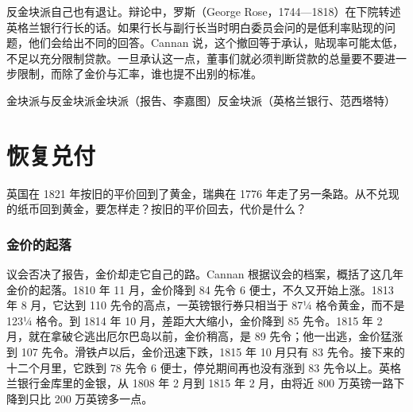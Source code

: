 反金块派自己也有退让。辩论中，罗斯（George Rose，1744—1818）在下院转述英格兰银行行长的话。如果行长与副行长当时明白委员会问的是低利率贴现的问题，他们会给出不同的回答\cite{cannan1919}。Cannan 说，这个撤回等于承认，贴现率可能太低，不足以充分限制贷款\cite{cannan1919}。一旦承认这一点，董事们就必须判断贷款的总量要不要进一步限制，而除了金价与汇率，谁也提不出别的标准。

\begin{compare}{金块派与反金块派}{金块派（报告、李嘉图）}{反金块派（英格兰银行、范西塔特）}
\end{compare}

\section{恢复兑付}\label{sec:bullion-resumption}

英国在 1821 年按旧的平价回到了黄金，瑞典在 1776 年走了另一条路。从不兑现的纸币回到黄金，要怎样走？按旧的平价回去，代价是什么？

\subsubsection{金价的起落}
议会否决了报告，金价却走它自己的路。Cannan 根据议会的档案，概括了这几年金价的起落。1810 年 11 月，金价降到 84 先令 6 便士，不久又开始上涨。1813 年 8 月，它达到 110 先令的高点，一英镑银行券只相当于 87¼ 格令黄金，而不是 123¼ 格令。到 1814 年 10 月，差距大大缩小，金价降到 85 先令。1815 年 2 月，就在拿破仑逃出厄尔巴岛以前，金价稍高，是 89 先令；他一出逃，金价猛涨到 107 先令。滑铁卢以后，金价迅速下跌，1815 年 10 月只有 83 先令。接下来的十二个月里，它跌到 78 先令 6 便士，停兑期间再也没有涨到 83 先令以上\cite{cannan1919}。英格兰银行金库里的金银，从 1808 年 2 月到 1815 年 2 月，由将近 800 万英镑一路下降到只比 200 万英镑多一点\cite{cannan1919}。

